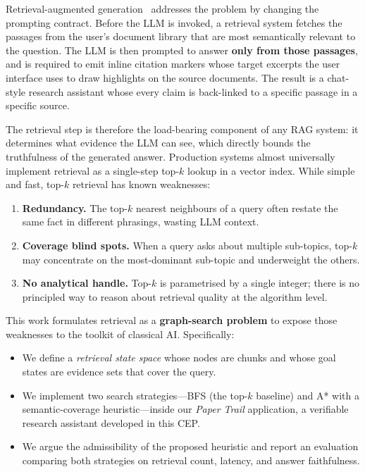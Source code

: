 \documentclass[conference]{IEEEtran}
\begin{document}
Retrieval-augmented generation~\cite{lewis2020rag} addresses the problem by
changing the prompting contract. Before the LLM is invoked, a retrieval
system fetches the passages from the user's document library that are most
semantically relevant to the question. The LLM is then prompted to answer
\textbf{only from those passages}, and is required to emit inline citation
markers whose target excerpts the user interface uses to draw highlights on
the source documents. The result is a chat-style research assistant whose
every claim is back-linked to a specific passage in a specific source.

The retrieval step is therefore the load-bearing component of any RAG system:
it determines what evidence the LLM can see, which directly bounds the
truthfulness of the generated answer. Production systems almost universally
implement retrieval as a single-step top-$k$ lookup in a vector index. While
simple and fast, top-$k$ retrieval has known weaknesses:

\begin{enumerate}
  \item \textbf{Redundancy.} The top-$k$ nearest neighbours of a query often
    restate the same fact in different phrasings, wasting LLM context.
  \item \textbf{Coverage blind spots.} When a query asks about multiple
    sub-topics, top-$k$ may concentrate on the most-dominant sub-topic
    and underweight the others.
  \item \textbf{No analytical handle.} Top-$k$ is parametrised by a single
    integer; there is no principled way to reason about retrieval quality
    at the algorithm level.
\end{enumerate}

This work formulates retrieval as a \textbf{graph-search problem} to expose
those weaknesses to the toolkit of classical AI. Specifically:

\begin{itemize}
  \item We define a \textit{retrieval state space} whose nodes are chunks and
    whose goal states are evidence sets that cover the query.
  \item We implement two search strategies---BFS (the top-$k$ baseline) and
    A* with a semantic-coverage heuristic---inside our \textit{Paper Trail}
    application, a verifiable research assistant developed in this CEP.
  \item We argue the admissibility of the proposed heuristic and report an
    evaluation comparing both strategies on retrieval count, latency, and
    answer faithfulness.
\end{itemize}
\end{document}
